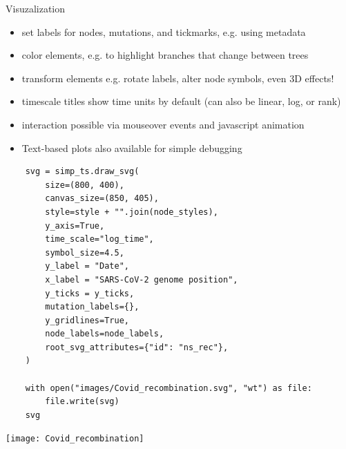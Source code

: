 \documentclass[landscape,a0paper,fontscale=0.292]{baposter}
\newcommand{\compresslist}{%
 \setlength{\itemsep}{1pt}%
 \setlength{\parskip}{0pt}%
 \setlength{\parsep}{0pt}%
 }
\begin{document}
\begin{poster}
\begin{posterbox}[name=viz,column=1,row=0,span=2,below=overview]{Visuzalization}
\end{posterbox}


\begin{posterbox}[name=vizlist,below=viz,column=1,row=0,span=1]{}

\begin{itemize} \compresslist
    \item set labels for nodes, mutations, and tickmarks, e.g. using metadata
    \item color elements, e.g. to highlight branches that change between trees
    \item transform elements e.g. rotate labels, alter node symbols, even 3D effects!
    \item timescale titles show time units by default (can also be linear, log, or rank)
    \item interaction possible via mouseover events and javascript animation
    \item Text-based plots also available for simple debugging
\end{itemize}

\end{posterbox}


\begin{posterbox}[name=vizex,below=viz,column=2,row=0,span=1]{}

\begin{verbatim}
    svg = simp_ts.draw_svg(
        size=(800, 400),
        canvas_size=(850, 405),
        style=style + "".join(node_styles),
        y_axis=True,
        time_scale="log_time",
        symbol_size=4.5,
        y_label = "Date",
        x_label = "SARS-CoV-2 genome position",
        y_ticks = y_ticks,
        mutation_labels={},
        y_gridlines=True,
        node_labels=node_labels,
        root_svg_attributes={"id": "ns_rec"},
    )

    with open("images/Covid_recombination.svg", "wt") as file:
        file.write(svg)
    svg
\end{verbatim}

\texttt{[image: Covid\_recombination]}


\end{posterbox}
\end{poster}
\end{document}
